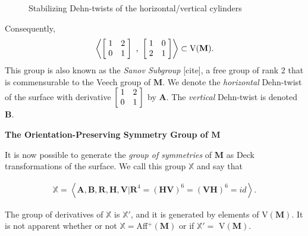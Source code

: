 \documentclass[]{article}
\begin{document}
\begin{figure}[H]
\centering

\caption{Stabilizing Dehn-twists of the horizontal/vertical cylinders}
\label{fig:skew}
\end{figure}

Consequently, 
\begin{equation}
\left< \left[ \hspace{1mm} \begin{matrix}
				1 &  2\\
				0 & 1
			\end{matrix}\hspace{1mm}\right] \text{ , }
			\left[ \hspace{1mm} \begin{matrix}
							1 & 0\\
							 2 & 1
						\end{matrix}\hspace{1mm}\right] \right>
						\subset \text{V}(\mathbf M).
\end{equation}
This group is also known as the \emph{Sanov Subgroup} [cite], a free group of rank 2 that is commensurable to the Veech group of $\mathbf M$. We denote the \emph{horizontal} Dehn-twist of the surface with derivative $\left[ \hspace{1mm} \begin{matrix}
				1 &  2\\
				0 & 1
			\end{matrix}\hspace{1mm}\right]$ by $\textbf{A}$. The \emph{vertical} Dehn-twist is denoted $\mathbf{B}$.
			
\vspace{0.1in}

\noindent\textbf{The Orientation-Preserving Symmetry Group of $\textbf{M}$}

It is now possible to generate the \emph{group of symmetries} of $\textbf{M}$ as Deck transformations of the surface. We call this group $\mathbb X$ and say that 

\begin{align}
\mathbb X= \left< \mathbf{A},\mathbf{B},\mathbf{R},\mathbf{H},\mathbf{V}\vert\mathbf{R}^4 = (\mathbf{H}\mathbf{V})^{6}=(\mathbf{V}\mathbf{H})^{6}=id  \right>.
\end{align}

The group of derivatives of $\mathbb X$ is $\mathbb X'$, and it is generated by elements of V$(\textbf{M})$. It is not apparent whether or not $\mathbb{X}=$Aff$^+(\mathbf{M})$ or if $\mathbb X'=$ V$(\mathbf{M})$.
\end{document}
